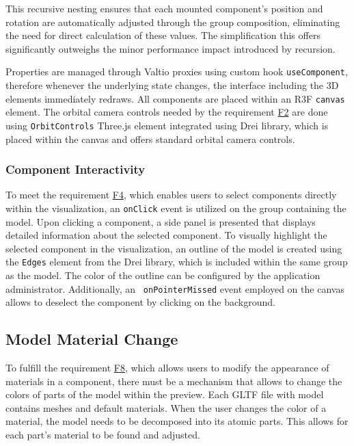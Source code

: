 This recursive nesting ensures that each mounted component's position and rotation are automatically adjusted through the group composition, eliminating the need for direct calculation of these values. The simplification this offers significantly outweighs the minor performance impact introduced by recursion.

Properties are managed through Valtio proxies using custom hook \texttt{useComponent}, therefore whenever the underlying state changes, the interface including the 3D elements immediately redraws.
All components are placed within an R3F \texttt{canvas} element. The orbital camera controls needed by the requirement \hyperref[itm:F2]{F2} are done using \texttt{OrbitControls} Three.js element integrated using Drei library, which is placed within the canvas and offers standard orbital camera controls.


\subsubsection{Component Interactivity}

To meet the requirement \hyperref[itm:F4]{F4}, which enables users to select components directly within the visualization, an \texttt{onClick} event is utilized on the group containing the model. Upon clicking a component, a side panel is presented that displays detailed information about the selected component. To visually highlight the selected component in the visualization, an outline of the model is created using the \texttt{Edges} element from the Drei library, which is included within the same group as the model. The color of the outline can be configured by the application administrator. Additionally, an \texttt{ onPointerMissed} event employed on the canvas allows to deselect the component by clicking on the background.


\subsection{Model Material Change}

To fulfill the requirement \hyperref[itm:F8]{F8}, which allows users to modify the appearance of materials in a component, there must be a mechanism that allows to change the colors of parts of the model within the preview. Each GLTF file with model contains meshes and default materials. When the user changes the color of a material, the model needs to be decomposed into its atomic parts. This allows for each part's material to be found and adjusted. 

